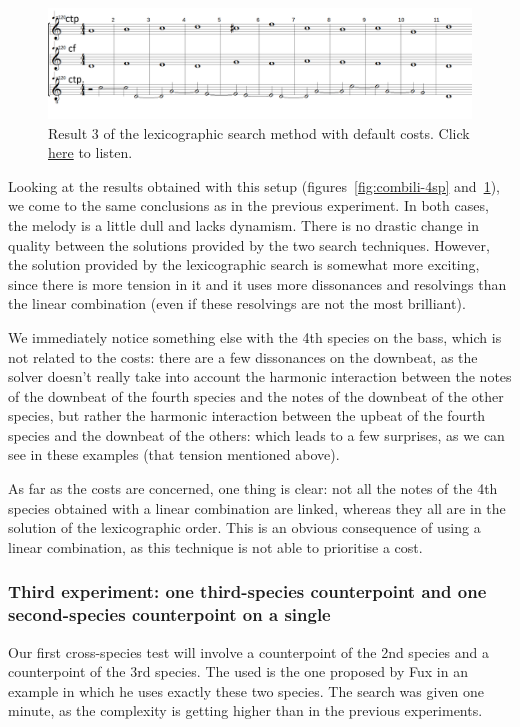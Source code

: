\begin{figure}[h]
    \centering
    \includegraphics[width=1\textwidth]{Images/Experiments/basic-lexico-4sp.png}
    \caption{Result 3 of the lexicographic search method with default costs. Click \href{https://youtu.be/msY1LOGw3v8}{here} to listen.}
    \label{fig:lexico-4sp}
\end{figure}
Looking at the results obtained with this setup (figures~\ref{fig:combili-4sp} and~\ref{fig:lexico-4sp}), we come to the same conclusions as in the previous experiment. 
In both cases, the melody is a little dull and lacks dynamism. There is no drastic change in quality between the solutions provided by the two search techniques. However, the solution provided by the lexicographic search is somewhat more exciting, since there is more tension in it and it uses more dissonances and resolvings than the linear combination (even if these resolvings are not the most brilliant).

We immediately notice something else with the 4th species on the bass, which is not related to the costs: there are a few dissonances on the downbeat, as the solver doesn't really take into account the harmonic interaction between the notes of the downbeat of the fourth species and the notes of the downbeat of the other species, but rather the harmonic interaction between the upbeat of the fourth species and the downbeat of the others: which leads to a few surprises, as we can see in these examples (that tension mentioned above).

As far as the costs are concerned, one thing is clear: not all the notes of the 4th species obtained with a linear combination are linked, whereas they all are in the solution of the lexicographic order. This is an obvious consequence of using a linear combination, as this technique is not able to prioritise a cost.


\subsubsection{Third experiment: one third-species counterpoint and one second-species counterpoint on a single \cf}
Our first cross-species test will involve a counterpoint of the 2nd species and a counterpoint of the 3rd species. The \cfs used is the one proposed by Fux in an example in which he uses exactly these two species. The search was given one minute, as the complexity is getting higher than in the previous experiments. \label{subsection:third-experiment-with-costs}


